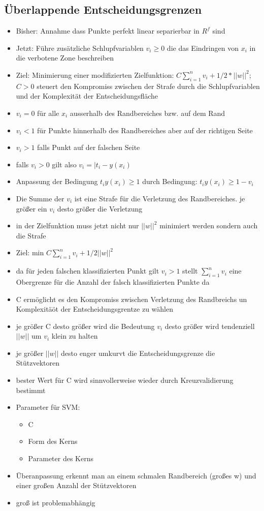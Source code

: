 \documentclass{article} %
\begin{document}
	\subsection{Überlappende Entscheidungsgrenzen}
	\begin{itemize}
		\item Bisher: Annahme dass Punkte perfekt linear separierbar in $R^f$ sind
		\item Jetzt: Führe zusätzliche Schlupfvariablen $v_i \geq 0$ die das Eindringen von $x_i$ in die verbotene Zone beschreiben
		\item Ziel: Minimierung einer modifizierten Zielfunktion: $C \sum_{i=1}^{n}v_i +1/2*||w||^2$; $C > 0$ steuert den Kompromiss zwischen der Strafe durch die Schlupfvariablen und der Komplexität der Entscheidungsfläche
		\item $v_i = 0$ für alle $x_i$ ausserhalb des Randbereiches bzw. auf dem Rand
		\item $v_i < 1$ für Punkte hinnerhalb des Randbereiches aber auf der richtigen Seite
		\item $v_i > 1$ falls Punkt auf der falschen Seite
		\item falls $v_i > 0$ gilt also $v_i = |t_i - y(x_i)$
		\item Anpassung der Bedingung $t_iy(x_i) \geq 1$ durch Bedingung: $t_iy(x_i) \geq 1 -v_i$
		\item Die Summe der $v_i$ ist eine Strafe für die Verletzung des Randbereiches. je größer ein $v_i$ desto größer die Verletzung
		\item in der Zielfunktion muss jetzt nicht nur $||w||^2$ minimiert werden sondern auch die Strafe
		\item Ziel: min $C\sum_{i=1}^{n}v_i + 1/2 ||w||^2$
		\item da für jeden falschen klassifizierten Punkt gilt $v_i > 1$ stellt $\sum_{i=1}^{n}v_i$ eine Obergrenze für die Anzahl der falsch klassifizierten Punkte da
		\item C ermöglicht es den Kompromiss zwischen Verletzung des Randbreichs un Komplexitäöt der Entscheidungsgrentze zu wählen
		\item je größer C desto größer wird die Bedeutung $v_i$ desto größer wird tendenziell $||w||$ um $v_i$ klein zu halten
		\item je größer $||w||$ desto enger umkurvt die Entscheidungsgrenze die Stützvektoren
		\item bester Wert für C wird sinnvollerweise wieder durch Kreuzvalidierung bestimmt
		\item Parameter für SVM:
		\begin{itemize}
			\item C
			\item Form des Kerns
			\item Parameter des Kerns
		\end{itemize}
		\item Überanpassung erkennt man an einem schmalen Randbereich (großes w) und einer großen Anzahl der Stützvektoren
		\item groß ist problemabhängig
	\end{itemize}
\end{document}
